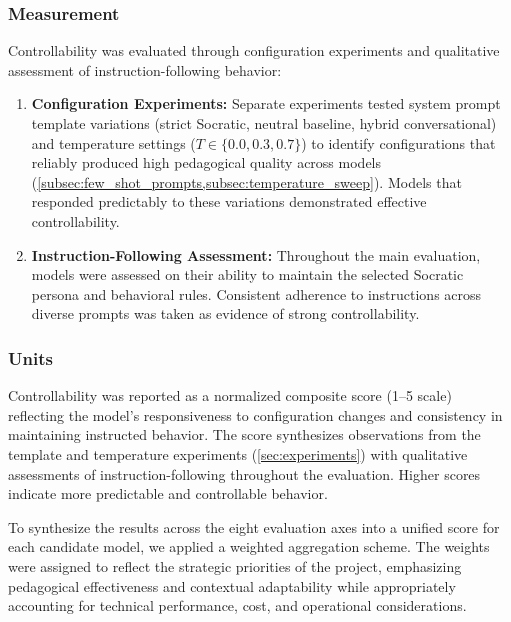 \subsubsection{Measurement}
\label{subsubsec:explainability_measurement}
Controllability was evaluated through configuration experiments and qualitative assessment of instruction-following behavior:

\begin{enumerate}
    \item \textbf{Configuration Experiments:} Separate experiments tested system prompt template variations (strict Socratic, neutral baseline, hybrid conversational) and temperature settings ($T \in \{0.0, 0.3, 0.7\}$) to identify configurations that reliably produced high pedagogical quality across models (\cref{subsec:few_shot_prompts,subsec:temperature_sweep}). Models that responded predictably to these variations demonstrated effective controllability.
    \item \textbf{Instruction-Following Assessment:} Throughout the main evaluation, models were assessed on their ability to maintain the selected Socratic persona and behavioral rules. Consistent adherence to instructions across diverse prompts was taken as evidence of strong controllability.
\end{enumerate}

\subsubsection{Units}
\label{subsubsec:explainability_units}
Controllability was reported as a normalized composite score (1--5 scale) reflecting the model's responsiveness to configuration changes and consistency in maintaining instructed behavior. The score synthesizes observations from the template and temperature experiments (\cref{sec:experiments}) with qualitative assessments of instruction-following throughout the evaluation. Higher scores indicate more predictable and controllable behavior.

To synthesize the results across the eight evaluation axes into a unified score for each candidate model, we applied a weighted aggregation scheme. The weights were assigned to reflect the strategic priorities of the project, emphasizing pedagogical effectiveness and contextual adaptability while appropriately accounting for technical performance, cost, and operational considerations.

